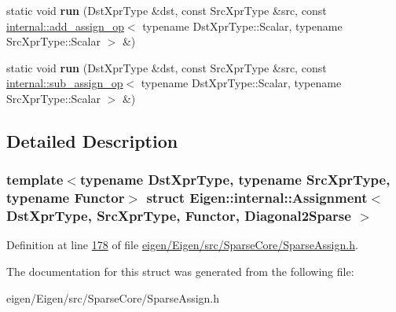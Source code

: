 \begin{DoxyCompactItemize}
static void {\bfseries run} (Dst\+Xpr\+Type \&dst, const Src\+Xpr\+Type \&src, const \hyperlink{struct_eigen_1_1internal_1_1add__assign__op}{internal\+::add\+\_\+assign\+\_\+op}$<$ typename Dst\+Xpr\+Type\+::\+Scalar, typename Src\+Xpr\+Type\+::\+Scalar $>$ \&)
\item 
\mbox{\label{struct_eigen_1_1internal_1_1_assignment_3_01_dst_xpr_type_00_01_src_xpr_type_00_01_functor_00_01_diagonal2_sparse_01_4_a6c98a58cd979be473443ee7b6c5fed0e}} 
static void {\bfseries run} (Dst\+Xpr\+Type \&dst, const Src\+Xpr\+Type \&src, const \hyperlink{struct_eigen_1_1internal_1_1sub__assign__op}{internal\+::sub\+\_\+assign\+\_\+op}$<$ typename Dst\+Xpr\+Type\+::\+Scalar, typename Src\+Xpr\+Type\+::\+Scalar $>$ \&)
\end{DoxyCompactItemize}


\subsection{Detailed Description}
\subsubsection*{template$<$typename Dst\+Xpr\+Type, typename Src\+Xpr\+Type, typename Functor$>$\newline
struct Eigen\+::internal\+::\+Assignment$<$ Dst\+Xpr\+Type, Src\+Xpr\+Type, Functor, Diagonal2\+Sparse $>$}



Definition at line \hyperlink{eigen_2_eigen_2src_2_sparse_core_2_sparse_assign_8h_source_l00178}{178} of file \hyperlink{eigen_2_eigen_2src_2_sparse_core_2_sparse_assign_8h_source}{eigen/\+Eigen/src/\+Sparse\+Core/\+Sparse\+Assign.\+h}.



The documentation for this struct was generated from the following file\+:\begin{DoxyCompactItemize}
\item 
eigen/\+Eigen/src/\+Sparse\+Core/\+Sparse\+Assign.\+h\end{DoxyCompactItemize}
